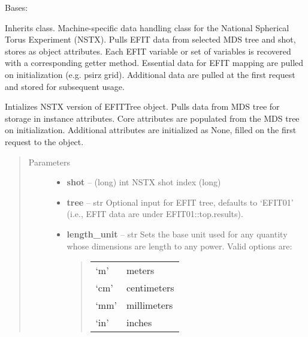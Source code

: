 \documentclass[letterpaper,10pt,english]{sphinxmanual}
\begin{document}
\begin{fulllineitems}
\label{eqtools:eqtools.NSTXEFIT.NSTXEFITTree}
Bases: {\hyperref[eqtools:eqtools.EFIT.EFITTree]{}}

Inherits  class. Machine-specific data
handling class for the National Spherical Torus Experiment (NSTX). Pulls EFIT
data from selected MDS tree and shot, stores as object attributes. Each EFIT
variable or set of variables is recovered with a corresponding getter method.
Essential data for EFIT mapping are pulled on initialization (e.g. psirz grid).
Additional data are pulled at the first request and stored for subsequent usage.

Intializes NSTX version of EFITTree object.  Pulls data from MDS tree for storage
in instance attributes.  Core attributes are populated from the MDS tree on initialization.
Additional attributes are initialized as None, filled on the first request to the object.
\begin{quote}\begin{description}
\item[{Parameters}] \leavevmode\begin{itemize}
\item {} 
\textbf{shot} -- (long) int
NSTX shot index (long)

\item {} 
\textbf{tree} -- str
Optional input for EFIT tree, defaults to `EFIT01'
(i.e., EFIT data are under EFIT01::top.results).

\item {} 
\textbf{length\_unit} -- 
str
Sets the base unit used for any quantity whose
dimensions are length to any power. Valid options are:
\begin{quote}

\begin{tabulary}{\linewidth}{|L|L|}
\hline

`m'
 & 
meters
\\

`cm'
 & 
centimeters
\\

`mm'
 & 
millimeters
\\

`in'
 & 
inches
\\


\end{tabulary}
\end{quote}
\end{itemize}
\end{description}
\end{quote}
\end{fulllineitems}
\end{document}
